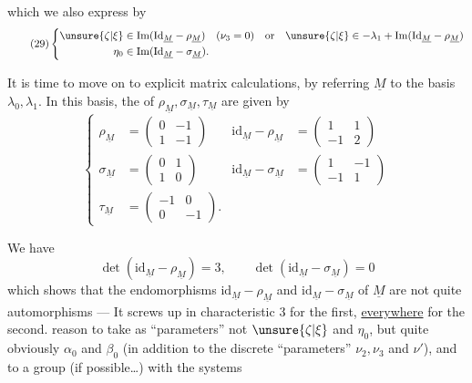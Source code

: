 
which we also express by
\[
\tag{29}
\left\{\begin{aligned}
\unsure{\zeta|\xi}&\in\operatorname{Im}(\mathrm{Id}_{\underline M}-\rho_{\underline M})
\quad(\nu_3=0)\quad\text{or}\quad
\unsure{\zeta|\xi}\in-\lambda_1+\operatorname{Im}(\mathrm{Id}_{\underline M}-\rho_{\underline M})\\
\eta_0&\in\operatorname{Im}(\mathrm{Id}_{\underline M}-\sigma_{\underline M}).
\end{aligned}\right.
\]

It is time to move on to explicit
matrix calculations, by referring $\underline M$ to
the basis $\lambda_0,\lambda_1$. In this basis, the
 of $\rho_{\underline M},\sigma_{\underline M},\tau_{\underline M}$ are given by
\[
\tag{30}
\left\{\begin{aligned}
\rho_{\underline M}&=\begin{pmatrix}0&-1\\1&-1\end{pmatrix}
&\mathrm{id}_{\underline M}-\rho_{\underline M}&=\begin{pmatrix}1&1\\-1&2\end{pmatrix}\\
\sigma_{\underline M}&=\begin{pmatrix}0&1\\1&0\end{pmatrix}
&\mathrm{id}_{\underline M}-\sigma_{\underline M}&=\begin{pmatrix}1&-1\\-1&1\end{pmatrix}\\
\tau_{\underline M}&=\begin{pmatrix}-1&0\\0&-1\end{pmatrix}.&&
\end{aligned}\right.
\]

We have
\[
\det(\mathrm{id}_{\underline M}-\rho_{\underline M})=3,
\qquad\det(\mathrm{id}_{\underline M}-\sigma_{\underline M})=0
\]
which shows that  the endomorphisms
$\mathrm{id}_{\underline M}-\rho_{\underline M}$ and $\mathrm{id}_{\underline M}-\sigma_{\underline M}$ of $\underline M$ are
not quite automorphisms ---
It screws up in characteristic 3 for the first, \uline{everywhere}
 for the second.
 reason to take as ``parameters''
not $\unsure{\zeta|\xi}$ and $\eta_0$, but quite obviously
$\alpha_0$ and $\beta_0$ (in addition to the discrete ``parameters''
$\nu_2,\nu_3$ and $\nu'$), and to   a
group (if possible\ldots) with the systems

